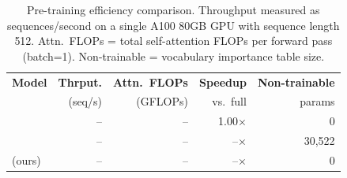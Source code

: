 
\begin{table}[t]
\centering
\small
\caption{
  Pre-training efficiency comparison.
  Throughput measured as sequences/second on a single A100 80GB GPU
  with sequence length 512.
  Attn.\ FLOPs = total self-attention FLOPs per forward pass (batch=1).
  Non-trainable = vocabulary importance table size.
}
\label{tab:efficiency}
\begin{tabular}{lrrrr}
\toprule
\textbf{Model}
  & \textbf{Thrput.} & \textbf{Attn.\ FLOPs} & \textbf{Speedup}
  & \textbf{Non-trainable} \\
  & (seq/s) & (GFLOPs) & vs.\ full & params \\
\midrule
\bertbase{}        & --   & -- & 1.00$\times$  & 0 \\
\baseline{}        & --   & -- & --$\times$  & 30,522 \\
\model{} (ours)    & --   & -- & --$\times$  & 0 \\
\bottomrule
\end{tabular}
\end{table}
